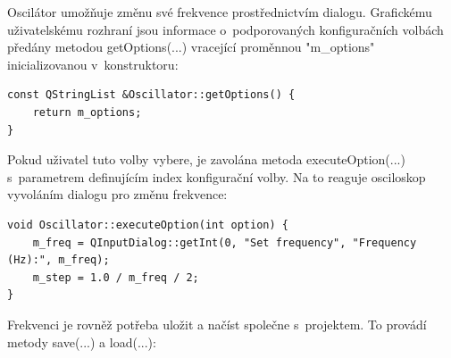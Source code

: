 Oscilátor umožňuje změnu své frekvence prostřednictvím dialogu. Grafickému uživatelskému rozhraní jsou informace o~podporovaných konfiguračních volbách předány metodou getOptions(...) vracející proměnnou "m\_options" inicializovanou v~konstruktoru:

\begin{lstlisting}
const QStringList &Oscillator::getOptions() {
	return m_options;
}
\end{lstlisting}

Pokud uživatel tuto volby vybere, je zavolána metoda executeOption(...) s~parametrem definujícím index konfigurační volby. Na to reaguje osciloskop vyvoláním dialogu pro změnu frekvence:

\begin{lstlisting}
void Oscillator::executeOption(int option) {
	m_freq = QInputDialog::getInt(0, "Set frequency", "Frequency (Hz):", m_freq);
	m_step = 1.0 / m_freq / 2;
}
\end{lstlisting}

Frekvenci je rovněž potřeba uložit a načíst společne s~projektem. To provádí metody save(...) a load(...):

